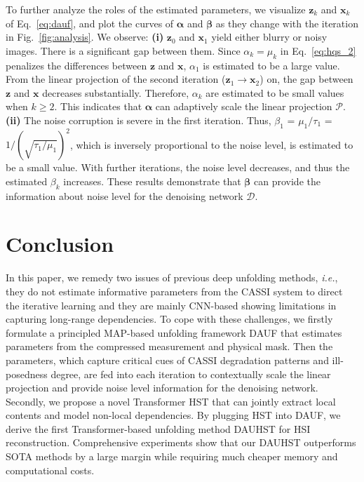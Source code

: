 \documentclass{article}
\begin{document}
To further analyze the roles of the estimated parameters, we visualize $\mathbf{z}_k$ and $\mathbf{x}_k$ of Eq.~\eqref{eq:dauf}, and plot the curves of $\boldsymbol{\alpha}$ and $\boldsymbol{\beta}$ as they change with the iteration in Fig.~\ref{fig:analysis}. We observe: \textbf{(i)} $\mathbf{z}_0$ and $\mathbf{x}_1$ yield either blurry or noisy images. There is a significant gap between them. Since  $\alpha_k = \mu_k$ in Eq.~\eqref{eq:hqs_2} penalizes the differences between $\mathbf{z}$ and $\mathbf{x}$, $\alpha_1$ is estimated to be a large value. From the linear projection of the second iteration ($\mathbf{z}_1 \rightarrow \mathbf{x}_2$) on, the gap between $\mathbf{z}$ and $\mathbf{x}$ decreases substantially. Therefore, $\alpha_{k}$ are estimated to be small values when $k\ge2$. This indicates that $\boldsymbol{\alpha}$ can adaptively scale the linear projection $\mathcal{P}$. \textbf{(ii)} The noise corruption is severe in the first iteration. Thus, $\beta_1$ = $\mu_1 / \tau_1$ = ${1/}{(\sqrt{\tau_1/\mu_1})^2}$, which is inversely proportional to the noise level, is estimated to be a small value. With further iterations, the noise level decreases, and thus the estimated   $\beta_k$ increases. These results demonstrate that $\boldsymbol{\beta}$ can provide the information about noise level  for the denoising network $\mathcal{D}$. 



\vspace{-2mm}
\section{Conclusion} 
\vspace{-2mm}
In this paper, we remedy two issues of previous deep unfolding methods, \emph{i.e.}, they do not estimate informative parameters from the CASSI system to direct the iterative learning and they are mainly CNN-based showing limitations in capturing long-range dependencies. To cope with  these challenges, we firstly formulate a principled MAP-based unfolding framework DAUF that estimates parameters from the compressed measurement and physical mask. Then the parameters, which capture critical cues of CASSI degradation patterns and ill-posedness degree, are fed into each iteration to contextually scale the linear projection and provide noise level information for the denoising network. Secondly, we propose a novel Transformer HST that can jointly extract local contents and model non-local dependencies. By plugging HST into DAUF, we derive the first Transformer-based unfolding method DAUHST for HSI reconstruction. Comprehensive experiments show that our DAUHST outperforms SOTA methods by a large margin while requiring much cheaper memory and computational costs. 

{
	
	
}
\end{document}
